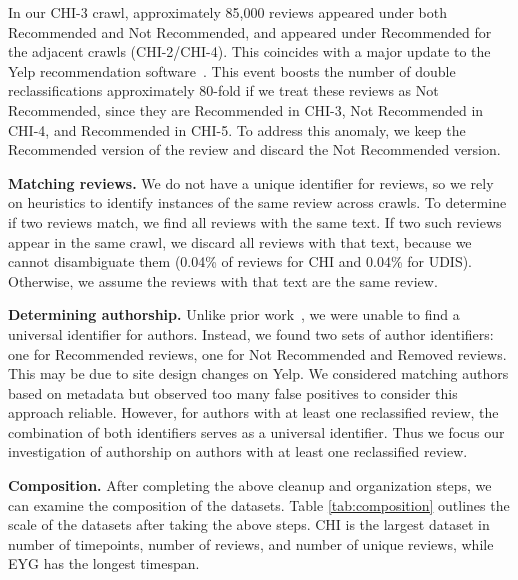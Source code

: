 In our CHI-3 crawl,
approximately 85,000 reviews appeared under both Recommended and Not Recommended, and appeared under Recommended for the adjacent crawls (CHI-2/CHI-4). This coincides with a major update to the Yelp recommendation software~\cite{yelp2021updates}. This event boosts the number of double reclassifications approximately 80-fold if we treat these reviews as Not Recommended, since they are Recommended in CHI-3, Not Recommended in CHI-4, and Recommended in CHI-5. To address this anomaly, we keep the Recommended version of the review and discard the Not Recommended version.

\textbf{Matching reviews.}
We do not have a unique identifier for reviews, so we rely on heuristics to identify instances of the same review across crawls. To determine if two reviews match, we find all reviews with the same text. If two such reviews appear in the same crawl, we discard all reviews with that text, because we cannot disambiguate them (0.04\% of reviews for CHI and 0.04\% for UDIS). Otherwise, we assume the reviews with that text are the same review.

\textbf{Determining authorship.}
Unlike prior work~\cite{mukherjee2013yelp,rayana2015collective}, we were unable to find a universal identifier for authors. Instead, we found two sets of author identifiers: one for Recommended reviews, one for Not Recommended and Removed reviews. This may be due to site design changes on Yelp. We considered matching authors based on metadata but observed too many false positives to consider this approach reliable. However, for authors with at least one reclassified review, the combination of both identifiers serves as a universal identifier. Thus we focus our investigation of authorship on authors with at least one reclassified review.

\textbf{Composition.} After completing the above cleanup and organization steps, we can examine the composition of the datasets. Table \ref{tab:composition} outlines the scale of the datasets after taking the above steps. CHI is the largest dataset in number of timepoints, number of reviews, and number of unique reviews, while EYG has the longest timespan.

